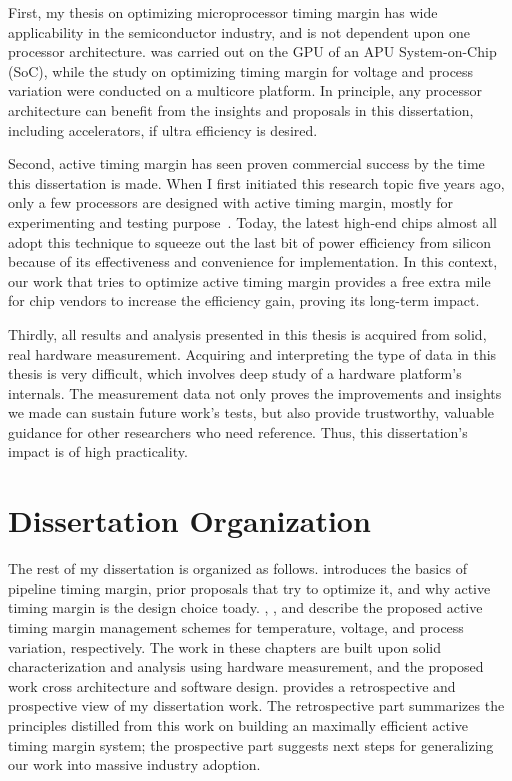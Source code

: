 First, my thesis on optimizing microprocessor timing margin has wide applicability in the semiconductor industry, and is not dependent upon one processor architecture. \tistates was carried out on the GPU of an APU System-on-Chip (SoC), while the study on optimizing timing margin for voltage and process variation were conducted on a multicore platform. In principle, any processor architecture can benefit from the insights and proposals in this dissertation, including accelerators, if ultra efficiency is desired. 

Second, active timing margin has seen proven commercial success by the time this dissertation is made. When I first initiated this research topic five years ago, only a few processors are designed with active timing margin, mostly for experimenting and testing purpose~\cite{lefurgy2011active, bowman201222nm}. Today, the latest high-end chips almost all adopt this technique to squeeze out the last bit of power efficiency from silicon~\cite{tokunaga20145,grenat20145,bowman20158,webel2015robust,vezyrtzis2018droop} because of its effectiveness and convenience for implementation. In this context, our work that tries to optimize active timing margin provides a free extra mile for chip vendors to increase the efficiency gain, proving its long-term impact.

Thirdly, all results and analysis presented in this thesis is acquired from solid, real hardware measurement. Acquiring and interpreting the type of data in this thesis is very difficult, which involves deep study of a hardware platform's internals. The measurement data not only proves the improvements and insights we made can sustain future work's tests, but also provide trustworthy, valuable guidance for other researchers who need reference. Thus, this dissertation's impact is of high practicality.


\section{Dissertation Organization}
\label{sec:intro:outline}

The rest of my dissertation is organized as follows. 
 introduces the basics of pipeline timing margin, prior proposals that try to optimize it, and why active timing margin is the design choice toady. 
, , and  describe the proposed active timing margin management schemes for temperature, voltage, and process variation, respectively. The work in these chapters are built upon solid characterization and analysis using hardware measurement, and the proposed work cross architecture and software design.  provides a retrospective and prospective view of my dissertation work. The retrospective part summarizes the principles distilled from this work on building an maximally efficient active timing margin system; the prospective part suggests next steps for generalizing our work into massive industry adoption.

